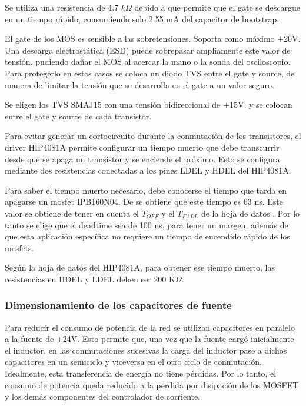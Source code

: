 \noindent Se utiliza una resistencia de 4.7 $k\Omega$ debido a que permite que el gate se descargue en un tiempo rápido, consumiendo solo 2.55 mA del capacitor de bootstrap.


\noindent El gate de los MOS es sensible a las sobretensiones. Soporta como máximo $\pm$20V. Una descarga electrostática (ESD) puede sobrepasar ampliamente este valor de tensión, pudiendo dañar el MOS al acercar la mano o la sonda del osciloscopio. Para protegerlo en estos casos se coloca un diodo TVS entre el gate y source, de manera de limitar la tensión que se desarrolla en el gate a un valor seguro.

\noindent Se eligen los TVS SMAJ15 con una tensión bidireccional de $\pm$15V. y se colocan entre el gate y source de cada transistor.


\noindent Para evitar generar un cortocircuito durante la conmutación de los transistores, el driver HIP4081A permite configurar un tiempo muerto que debe transcurrir desde que se apaga un transistor y se enciende el próximo. Esto se configura mediante dos resistencias conectadas a los pines LDEL y HDEL del HIP4081A.

\noindent Para saber el tiempo muerto necesario, debe conocerse el tiempo que tarda en apagarse un mosfet IPB160N04. De \cite{IPB160N04} se obtiene que este tiempo es 63 ns. Este valor se obtiene de tener en cuenta el $T_{OFF}$ y el $T_{FALL}$ de la hoja de datos . Por lo tanto se elige que el deadtime sea de 100 ns, para tener un margen, además de que esta aplicación específica no requiere un tiempo de encendido rápido de los mosfets.

\noindent Según la hoja de datos del HIP4081A, para obtener ese tiempo muerto, las resistencias en HDEL y LDEL deben ser 200 K$\Omega$.

\subsubsection{Dimensionamiento de los capacitores de fuente}
	
\noindent Para reducir el consumo de potencia de la red se utilizan capacitores en paralelo a la fuente de +24V. Esto permite que, una vez que la fuente cargó inicialmente el inductor, en las conmutaciones sucesivas la carga del inductor pase a dichos capacitores en un semiciclo y viceversa en el otro ciclo de conmutación. Idealmente, esta transferencia de energía no tiene pérdidas. Por lo tanto, el consumo de potencia queda reducido a la perdida por disipación de los MOSFET y los demás componentes del controlador de corriente. 

